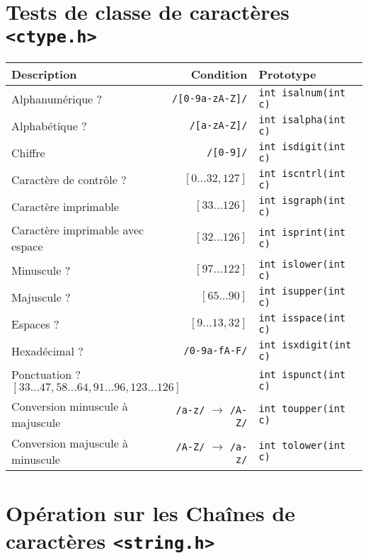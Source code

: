 \documentclass{article}
\newcommand{\cd}{\lstinline}
\begin{document}
\begin{multicols*}{3}
\section*{Tests de classe de caractères \texttt{<ctype.h>}}

\begin{tabularx}{\linewidth}{X|r|l}
  \bf Description         & Condition              & Prototype \\
  \hline
  Alphanumérique ?        & \texttt{/[0-9a-zA-Z]/} & \cd{int isalnum(int c)} \\
  Alphabétique ?          & \texttt{/[a-zA-Z]/} & \cd{int isalpha(int c)} \\
  Chiffre                 & \texttt{/[0-9]/} & \cd{int isdigit(int c)} \\
  Caractère de contrôle ? & \footnotesize $[0\dots32, 127]$  & \cd{int iscntrl(int c)} \\
  Caractère imprimable    & \footnotesize $[33\dots 126]$ & \cd{int isgraph(int c)} \\
  Caractère imprimable avec espace & \footnotesize$[32\dots 126]$ & \cd{int isprint(int c)} \\
  Minuscule ?             & \footnotesize $[97\dots 122]$ & \cd{int islower(int c)} \\
  Majuscule ?             & \footnotesize $[65\dots 90]$ & \cd{int isupper(int c)} \\
  Espaces ?               & \footnotesize $[9\dots13,32]$ & \cd{int isspace(int c)} \\
  Hexadécimal ?           & \texttt{/0-9a-fA-F/} &  \cd{int isxdigit(int c)} \\
  \multicolumn{2}{l|}{Ponctuation ? \hfill\footnotesize $[33\dots 47, 58\dots64, 91\dots96, 123\dots126]$} & \cd{int ispunct(int c)} \\
  \hline
  Conversion minuscule à majuscule & \texttt{/a-z/} $\to$ \texttt{/A-Z/} & \cd{int toupper(int c)} \\
  Conversion majuscule à minuscule & \texttt{/A-Z/} $\to$ \texttt{/a-z/} & \cd{int tolower(int c)} \\
\end{tabularx}

\section*{Opération sur les Chaînes de caractères \texttt{<string.h>}}


\end{multicols*}
\end{document}

